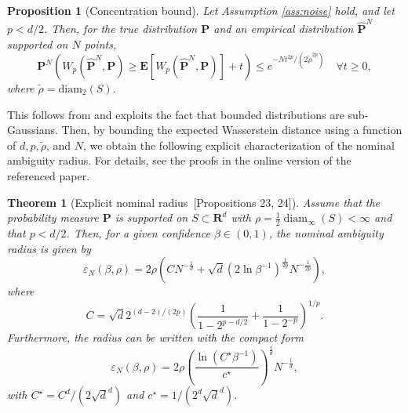 \documentclass[12pt]{article}
\newcommand{\prob}{{\mathbf P}}
\newcommand{\supp}{S}
\newcommand{\epsnom}{\varepsilon}
\newtheorem{theorem}{Theorem}[section]  %
\newtheorem{proposition}{Proposition}[section]
\begin{document}
\begin{proposition}[Concentration bound]\label{prop:empirical}
Let Assumption \ref{ass:noise} hold, and let $p < d/2$. Then, for the true distribution $\prob$ and an empirical distribution $\hat{\prob}^N$ supported on $N$ points,
$$\mathbf{P}^N\left(W_p\left(\hat{\mathbf{P}}^N, \mathbf{P}\right) \geq \mathbf{E}\left[W_p\left(\hat{\mathbf{P}}^N, \mathbf{P}\right)\right]+t\right) \leq e^{-N t^{2 p} /\left(2 \tilde{\rho}^{2 p}\right)} \quad \forall t \geq 0,$$
where $\tilde{\rho} = \mathrm{diam}_2(\supp)$.
\end{proposition}
This follows from \cite[Proposition A.2]{boissard2014mean} and exploits the fact that bounded distributions are sub-Gaussians. 
Then, by bounding the expected Wasserstein distance using a function of $d,p,\tilde{\rho}$, and $N$,  we obtain the following explicit characterization of the nominal ambiguity radius. For details, see the proofs in the online version of the referenced paper. 

\begin{theorem}[{Explicit nominal radius~\cite{bounded_wass}[Propositions 23, 24]}]\label{explicit}
 Assume that the probability measure $\mathbf{P}$ is supported on $\supp \subset \mathbf{R}^d$ with $\rho=\frac{1}{2} \operatorname{diam}_{\infty}(\supp)<\infty$ and that $p<d / 2$. Then, for a given confidence $\beta \in (0,1)$, the nominal ambiguity radius is given by
$$
\epsnom_N(\beta, \rho)=2 \rho\left(C N^{-\frac{1}{d}}+\sqrt{d}\left(2 \ln \beta^{-1}\right)^{\frac{1}{2 p}} N^{-\frac{1}{2 p}}\right),
$$
where 
$$C=\sqrt{d} 2^{(d-2) /(2 p)}\left(\frac{1}{1-2^{p-d / 2}}+\frac{1}{1-2^{-p}}\right)^{1 / p} .$$
Furthermore, the radius can be written with the compact form 
$$
\epsnom_N(\beta, \rho)=2 \rho\left(\frac{\ln \left(C^{\star} \beta^{-1}\right)}{c^{\star}}\right)^{\frac{1}{d}} N^{-\frac{1}{d}},
$$
with $C^{\star}=C^d/(2 \sqrt{d}^d)$ and $c^{\star}=1/(2^d \sqrt{d}^d)$.
\end{theorem}
\end{document}
